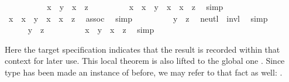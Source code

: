 \begin{isabellebody}
%
\isadelimproof
\ \ \ \ %
\endisadelimproof
%
\isatagproof
{}\isamarkupfalse%
\isanewline
\ \ \ \ \isamarkupfalse%
\ {\isachardoublequoteopen}x\ {\isasymotimes}\ y\ {\isacharequal}\ x\ {\isasymotimes}\ z{\isachardoublequoteclose}\isanewline
\ \ \ \ \ \ \isamarkupfalse%
\ \isamarkupfalse%
\ {\isachardoublequoteopen}x{\isasymdiv}\ {\isasymotimes}\ {\isacharparenleft}x\ {\isasymotimes}\ y{\isacharparenright}\ {\isacharequal}\ x{\isasymdiv}\ {\isasymotimes}\ {\isacharparenleft}x\ {\isasymotimes}\ z{\isacharparenright}{\isachardoublequoteclose}\ \isamarkupfalse%
\ simp\isanewline
\ \ \ \ \ \ \isamarkupfalse%
\ \isamarkupfalse%
\ {\isachardoublequoteopen}{\isacharparenleft}x{\isasymdiv}\ {\isasymotimes}\ x{\isacharparenright}\ {\isasymotimes}\ y\ {\isacharequal}\ {\isacharparenleft}x{\isasymdiv}\ {\isasymotimes}\ x{\isacharparenright}\ {\isasymotimes}\ z{\isachardoublequoteclose}\ \isamarkupfalse%
\ assoc\ \isamarkupfalse%
\ simp\isanewline
\ \ \ \ \ \ \isamarkupfalse%
\ \isamarkupfalse%
\ {\isachardoublequoteopen}y\ {\isacharequal}\ z{\isachardoublequoteclose}\ \isamarkupfalse%
\ neutl\ \ invl\ \isamarkupfalse%
\ simp\isanewline
\ \ \ \ \isamarkupfalse%
\isanewline
\ \ \ \ \isamarkupfalse%
\ {\isachardoublequoteopen}y\ {\isacharequal}\ z{\isachardoublequoteclose}\isanewline
\ \ \ \ \ \ \isamarkupfalse%
\ \isamarkupfalse%
\ {\isachardoublequoteopen}x\ {\isasymotimes}\ y\ {\isacharequal}\ x\ {\isasymotimes}\ z{\isachardoublequoteclose}\ \isamarkupfalse%
\ simp\isanewline
\ \ \ \ \isamarkupfalse%
%
\endisatagproof
{\isafoldproof}%
%
\isadelimproof
%
\endisadelimproof
%
\begin{isamarkuptext}%
\noindent Here the  target specification
  indicates that the result is recorded within that context for later
  use.  This local theorem is also lifted to the global one  .  Since type  has been made an instance of
   before, we may refer to that fact as well: .%

\end{isamarkuptext}
\end{isabellebody}
